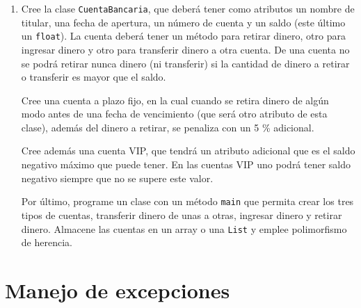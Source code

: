 \documentclass[a4paper]{article}
\newcommand{\code}[1]{\texttt{#1}}
\begin{document}
\begin{enumerate}
    Creae una plantilla de una empresa con 2 jefes, 5 viajantes y 15 empleados, y muestre por pantalla sus respectivos salarios. Para determinar el número de viajes de los viajantes y la antigüedad de los jefes puedes generar números aleatorios entre 0 y 10. Emplee el polimorfismo de herencia.

    \item Cree la clase \code{CuentaBancaria}, que deberá tener como atributos un nombre de titular, una fecha de apertura, un número de cuenta y un saldo (este último un \code{float}). La cuenta deberá tener un método para retirar dinero, otro para ingresar dinero y otro para transferir dinero a otra cuenta. De una cuenta no se podrá retirar nunca dinero (ni transferir) si la cantidad de dinero a retirar o transferir es mayor que el saldo.
    
    Cree una cuenta a plazo fijo, en la cual cuando se retira dinero de algún modo antes de una fecha de vencimiento (que será otro atributo de esta clase), además del dinero a retirar, se penaliza con un 5 \% adicional.
    
    Cree además una cuenta VIP, que tendrá un atributo adicional que es el saldo negativo máximo que puede tener. En las cuentas VIP uno podrá tener saldo negativo siempre que no se supere este valor.
    
    Por último, programe un clase con un método \code{main} que permita crear los tres tipos de cuentas, transferir dinero de unas a otras, ingresar dinero y retirar dinero. Almacene las cuentas en un array o una \code{List} y emplee polimorfismo de herencia.

\end{enumerate}

\section{Manejo de excepciones}
\end{document}
